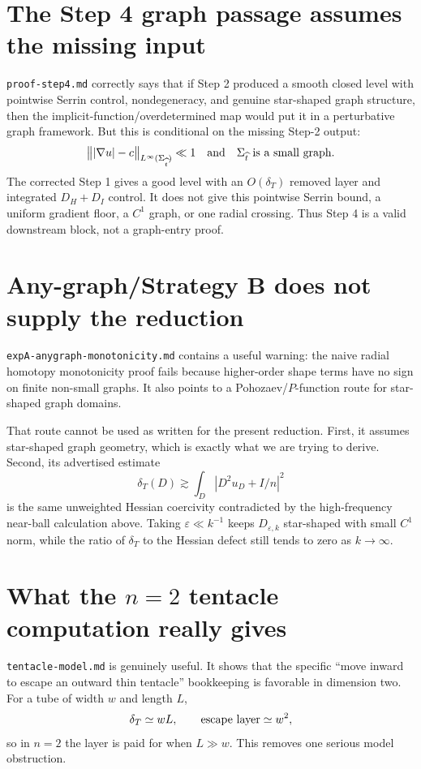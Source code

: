 \documentclass[11pt]{article}
\newcommand{\dT}{\delta_T}
\newcommand{\Ht}{\widehat t}
\begin{document}
\section{The Step 4 graph passage assumes the missing input}

\texttt{proof-step4.md} correctly says that if Step 2 produced a smooth
closed level with pointwise Serrin control, nondegeneracy, and genuine
star-shaped graph structure, then the implicit-function/overdetermined map
would put it in a perturbative graph framework.  But this is conditional on
the missing Step-2 output:
\[
   \bigl\||\nabla u|-c\bigr\|_{L^\infty(\Sigma_{\Ht})}\ll1
   \quad\hbox{and}\quad
   \Sigma_{\Ht}\hbox{ is a small graph.}
\]
The corrected Step 1 gives a good level with an \(O(\dT)\) removed layer and
integrated \(D_H+D_I\) control.  It does not give this pointwise Serrin bound,
a uniform gradient floor, a \(C^1\) graph, or one radial crossing.  Thus Step 4
is a valid downstream block, not a graph-entry proof.

\section{Any-graph/Strategy B does not supply the reduction}

\texttt{expA-anygraph-monotonicity.md} contains a useful warning: the naive
radial homotopy monotonicity proof fails because higher-order shape terms have
no sign on finite non-small graphs.  It also points to a Pohozaev/\(P\)-function
route for star-shaped graph domains.

That route cannot be used as written for the present reduction.  First, it
assumes star-shaped graph geometry, which is exactly what we are trying to
derive.  Second, its advertised estimate
\[
   \dT(D)\gtrsim \int_D |D^2u_D+I/n|^2
\]
is the same unweighted Hessian coercivity contradicted by the high-frequency
near-ball calculation above.  Taking \(\varepsilon\ll k^{-1}\) keeps
\(D_{\varepsilon,k}\) star-shaped with small \(C^1\) norm, while the ratio of
\(\dT\) to the Hessian defect still tends to zero as \(k\to\infty\).

\section{What the \(n=2\) tentacle computation really gives}

\texttt{tentacle-model.md} is genuinely useful.  It shows that the specific
``move inward to escape an outward thin tentacle'' bookkeeping is favorable in
dimension two.  For a tube of width \(w\) and length \(L\),
\[
   \dT \simeq wL,
   \qquad
   \hbox{escape layer}\simeq w^2,
\]
so in \(n=2\) the layer is paid for when \(L\gg w\).  This removes one serious
model obstruction.
\end{document}
